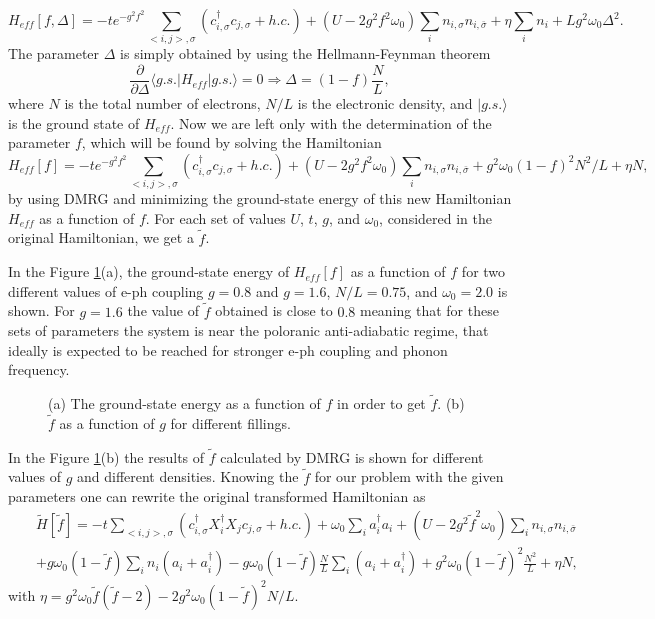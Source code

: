 \documentclass[article,11pt]{revtex4}
\begin{document}
\begin{equation}\label{Heff_def}
H_{eff} [f,\Delta]=-t e^{-g^2 f^2} \sum\limits_{<i,j>,
\sigma}(c^\dagger_{i,\sigma} c_{j,\sigma} + h.c.)+(U-2 g^2 f^2 \omega_0) \sum\limits_{i} n_{i,\sigma}
n_{i,\bar{\sigma}} + \eta \sum\limits_i n_i  + L g^2 \omega_0 \Delta^2.
\end{equation}
The parameter $\Delta$ is simply obtained by using the Hellmann-Feynman theorem 
\[
\frac {\partial}{\partial \Delta} \langle g.s.|H_{eff}|g.s.\rangle = 0 \Rightarrow
\Delta = (1-f) \frac {N}{L},
\]
where $N$ is the total number of electrons, $N/L$ is the electronic density, and $|g.s. \rangle$ is the ground state of $H_{eff}$. 
Now we are left only with the determination of the parameter $f$, which will be found by solving the Hamiltonian
\begin{equation} \label{Heff_f}
H_{eff} [f]=-t e^{-g^2 f^2} \sum\limits_{<i,j>,
\sigma}(c^\dagger_{i,\sigma} c_{j,\sigma} + h.c.) + (U-2 g^2 f^2 \omega_0) \sum\limits_{i} n_{i,\sigma}
n_{i,\bar{\sigma}} + g^2 \omega_0 (1-f)^2 N^2/L + \eta N,
\end{equation}
by using DMRG and minimizing the ground-state energy of this new Hamiltonian $H_{eff}$ as a function of $f$. For each set of values $U$, $t$, $g$, and $\omega_0$, considered in the original Hamiltonian, we get a $\tilde{f}$. 

In the Figure \ref{fig:f_best_energy}(a), the ground-state energy of $H_{eff}[f]$ as a function of $f$ for two different values of e-ph coupling $g=0.8$ and $g=1.6$, $N/L=0.75$, and $\omega_0=2.0$ is shown.
For $g=1.6$  the value of $\tilde{f}$ obtained is close to $0.8$ meaning that for these sets of parameters the system is near the poloranic anti-adiabatic regime, that ideally is expected to be reached for stronger e-ph coupling and phonon frequency.


\begin{centering}
\begin{figure}
\caption{(a) The ground-state energy as a function of $f$ in order to get $\tilde{f}$. (b) $\tilde{f}$ as a function of $g$ for different fillings.} 
\label{fig:f_best_energy}
\end{figure}
\end{centering}

In the Figure \ref{fig:f_best_energy}(b) the results of $\tilde{f}$ calculated by DMRG is shown for different values of $g$ and different densities. 
Knowing the $\tilde{f}$ for our problem with the given parameters one can rewrite the original transformed Hamiltonian as
\begin{eqnarray}
\label{Htilde1}
&&\tilde{H}[\tilde{f}]=-t \sum\limits_{<i,j>, \sigma}(c^\dagger_{i,\sigma} X^\dagger_i X_j c_{j,\sigma} + h.c.) + \omega_0 \sum\limits_i a^\dagger_i a_i + (U-2 g^2 \tilde{f}^2 \omega_0) \sum\limits_{i} n_{i,\sigma} n_{i,\bar{\sigma}} \\
&&+ g \omega_0 (1-\tilde{f}) \sum\limits_i n_i (a_i+a^\dagger_i) - g \omega_0 (1-\tilde{f}) \frac{N}{L} \sum\limits_i (a_i+a^\dagger _i)
+ g^2 \omega_0 (1-\tilde{f})^2 \frac {N^2}{L} + \eta N, \nonumber
\end{eqnarray}
with $\eta = g^2 \omega_0 \tilde{f} (\tilde{f}-2) - 2 g^2 \omega_0 (1-\tilde{f})^2 N/L$.
\end{document}
